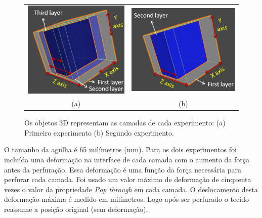 \begin{figure}[ht!]
    \centering
        \begin{tabular}{cc}
        \includegraphics[width=0.3\linewidth]{capitulos/figuras/First.Experiment - axis.PNG} & 
        \includegraphics[width=0.35\linewidth]{capitulos/figuras/Second.Experiment - axis.PNG} 
        \\
        (a) & (b)
        \end{tabular}
    \caption{Os objetos 3D representam as camadas de cada experimento: (a) Primeiro experimento (b) Segundo experimento.}
    \label{fig:objectsExperiments}
\end{figure}

O tamanho da agulha é 65 milímetros (mm). Para os dois experimentos foi incluída uma deformação na interface de cada camada com o aumento da força antes da perfuração. Essa deformação é uma função da força necessária para perfurar cada camada. Foi usado um valor máximo de deformação de cinquenta vezes o valor da propriedade \textit{Pop through} em cada camada. O deslocamento desta deformação máxima é medido em milímetros. Logo após ser perfurado o tecido reassume a posição original (sem deformação). 

